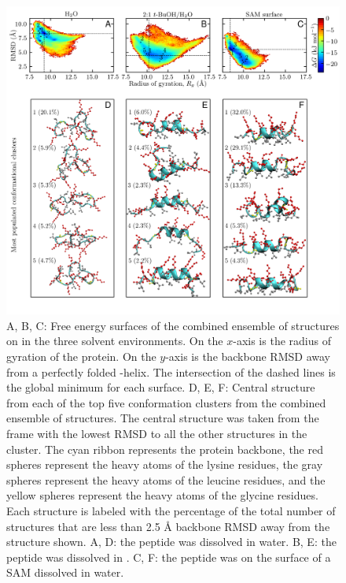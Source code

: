 \begin{figure}
    \center
    \includegraphics[width=5.50in]{figures-helix/clusters_proofs.png}
    \caption[Free energy surfaces and most populated clusters of \pep{} in each solvent environment]{
        A, B, C: Free energy surfaces of the combined ensemble of structures on \pep{} in the three solvent environments. 
        On the $x$-axis is the radius of gyration of the protein. 
        On the $y$-axis is the backbone RMSD away from a perfectly folded \textalpha{}-helix. 
        The intersection of the dashed lines is the global minimum for each surface. 
        D, E, F: Central structure from each of the top five conformation clusters from the combined ensemble of structures. 
        The central structure was taken from the frame with the lowest RMSD to all the other structures in the cluster. 
        The cyan ribbon represents the protein backbone, the red spheres represent the heavy atoms of the lysine residues, the gray spheres represent the heavy atoms of the leucine residues, and the yellow spheres represent the heavy atoms of the glycine residues. 
        Each structure is labeled with the percentage of the total number of structures that are less than 2.5 \si{\angstrom} backbone RMSD away from the structure shown. 
        A, D: the peptide was dissolved in water. 
        B, E: the peptide was dissolved in \tbawat{}. 
        C, F: the peptide was on the surface of a SAM dissolved in water.
    }
    \label{fig:helix-free_cluster}
\end{figure}

